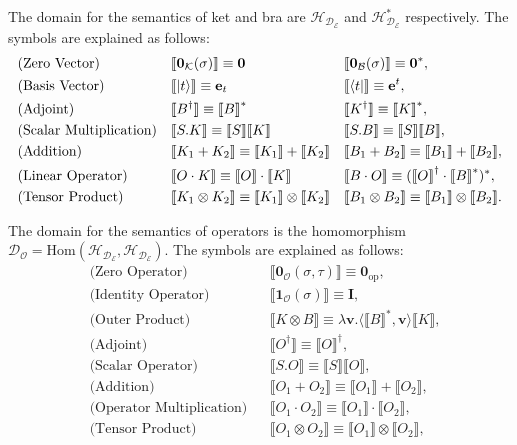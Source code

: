\documentclass[manuscript, review, timestamp]{acmart}
\newcommand*{\sem}[1]{{\llbracket #1 \rrbracket}}
\begin{document}
\begin{definition}
  The domain for the semantics of ket and bra are $\mathcal{H}_{\mathcal{D}_\mathcal{E}}$ and $\mathcal{H}_{\mathcal{D}_\mathcal{E}}^*$ respectively.
  The symbols are explained as follows:
  \begin{align*}
    & \text{(Zero Vector)} &&
    \sem{\mathbf{0}_\mathcal{K}(\sigma)} \equiv \mathbf{0} && \sem{\mathbf{0}_\mathcal{B}(\sigma)} \equiv \mathbf{0}^*, \\
    & \text{(Basis Vector)} &&
    \sem{\ket{t}} \equiv \mathbf{e}_t && \sem{\bra{t}} \equiv \mathbf{e}^t, \\
    & \text{(Adjoint)} &&
    \sem{B^\dagger} \equiv \sem{B}^* && \sem{K^\dagger} \equiv \sem{K}^*, \\
    & \text{(Scalar Multiplication)} &&
    \sem{S.K} \equiv \sem{S} \sem{K} && \sem{S.B} \equiv \sem{S} \sem{B}, \\
    & \text{(Addition)} &&
    \sem{K_1 + K_2} \equiv \sem{K_1} + \sem{K_2} && \sem{B_1 + B_2} \equiv \sem{B_1} + \sem{B_2}, \\
    & \text{(Linear Operator)} &&
    \sem{O \cdot K} \equiv \sem{O} \cdot \sem{K} && \sem{B \cdot O} \equiv (\sem{O}^\dagger \cdot \sem{B}^*)^*, \\
    & \text{(Tensor Product)} &&
    \sem{K_1 \otimes K_2} \equiv \sem{K_1} \otimes \sem{K_2} && \sem{B_1 \otimes B_2} \equiv \sem{B_1} \otimes \sem{B_2}.
  \end{align*}
\end{definition}

\begin{definition}
  The domain for the semantics of operators is the homomorphism $\mathcal{D}_\mathcal{O} = \textrm{Hom}(\mathcal{H}_{\mathcal{D}_\mathcal{E}}, \mathcal{H}_{\mathcal{D}_\mathcal{E}})$.
  The symbols are explained as follows:
  \begin{align*}
    & \text{(Zero Operator)} &&
    \sem{\mathbf{0}_\mathcal{O}(\sigma, \tau)} \equiv \mathbf{0}_{\textrm{op}}, \\
    & \text{(Identity Operator)} &&
    \sem{\mathbf{1}_\mathcal{O}(\sigma)} \equiv \mathbf{I}, \\
    & \text{(Outer Product)} &&
    \sem{K \otimes B} \equiv \lambda \mathbf{v}. \langle \sem{B}^*, \mathbf{v}\rangle \sem{K}, \\
    & \text{(Adjoint)} &&
    \sem{O^\dagger} \equiv \sem{O}^\dagger, \\
    & \text{(Scalar Operator)} &&
    \sem{S.O} \equiv \sem{S} \sem{O}, \\
    & \text{(Addition)} &&
    \sem{O_1 + O_2} \equiv \sem{O_1}+\sem{O_2}, \\
    & \text{(Operator Multiplication)} &&
    \sem{O_1 \cdot O_2} \equiv \sem{O_1} \cdot \sem{O_2}, \\
    & \text{(Tensor Product)} &&
    \sem{O_1 \otimes O_2} \equiv \sem{O_1} \otimes \sem{O_2},
  \end{align*}
\end{definition}
\end{document}
